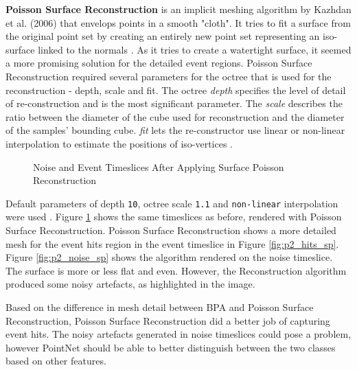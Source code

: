 \textbf{Poisson Surface Reconstruction} is an implicit meshing algorithm by Kazhdan et al. (2006) that envelops points in a smooth "cloth". It tries to fit a surface from the original point set by creating an entirely new point set representing an iso-surface linked to the normals \cite{kazhdan2006poisson}. As it tries to create a watertight surface, it seemed a more promising solution for the detailed event regions. Poisson Surface Reconstruction required several parameters for the octree that is used for the reconstruction \cite{kazhdan2006poisson} - depth, scale and fit. The octree \textit{depth} specifies the level of detail of re-construction and is the most significant parameter. The \textit{scale} describes the ratio between the diameter of the cube used for reconstruction and the diameter of the samples’ bounding cube. \textit{fit} lets the re-constructor use linear or non-linear interpolation to estimate the positions of iso-vertices \cite{kazhdan2006poisson}.

\begin{figure}[ht!]   
\centering
{}
\hspace{0.01cm}
\caption[]{Noise and Event Timeslices After Applying Surface Poisson Reconstruction}
\label{fig:p2_sp}
\end{figure}

Default parameters of depth \texttt{10}, octree scale \texttt{1.1} and \texttt{non-linear} interpolation were used  \cite{LocalChapterEvents:ItalChap:ItalianChapConf2008:129-136}. Figure \ref{fig:p2_sp} shows the same timeslices as before, rendered with Poisson Surface Reconstruction. Poisson Surface Reconstruction shows a more detailed mesh for the event hits region in the event timeslice in Figure \ref{fig:p2_hits_sp}. Figure \ref{fig:p2_noise_sp} shows the algorithm rendered on the noise timeslice. The surface is more or less flat and even. However, the Reconstruction algorithm produced some noisy artefacts, as highlighted in the image.

Based on the difference in mesh detail between BPA and Poisson Surface Reconstruction, Poisson Surface Reconstruction did a better job of capturing event hits. The noisy artefacts generated in noise timeslices could pose a problem, however PointNet should be able to better distinguish between the two classes based on other features. 


